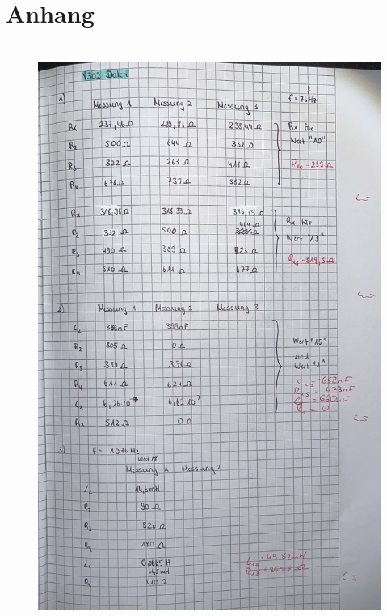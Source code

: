 \section{Anhang}

\begin{figure}[H]
    \centering
    \includegraphics[height=19cm]{bilder/1.jpeg}
\end{figure}

